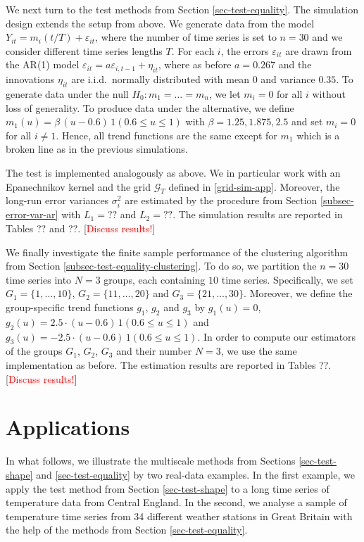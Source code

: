 We next turn to the test methods from Section \ref{sec-test-equality}. The simulation design extends the setup from above. We generate data from the model $Y_{it} = m_i(t/T) + \varepsilon_{it}$, where the number of time series is set to $n = 30$ and we consider different time series lengths $T$. For each $i$, the errors $\varepsilon_{it}$ are drawn from the AR(1) model $\varepsilon_{it} = a \varepsilon_{i,t-1} + \eta_{it}$, where as before $a = 0.267$ and the innovations $\eta_{it}$ are i.i.d.\ normally distributed with mean $0$ and variance $0.35$. To generate data under the null $H_0: m_1 = \ldots = m_n$, we let $m_i = 0$ for all $i$ without loss of generality. To produce data under the alternative, we define $m_1(u) = \beta \, (u - 0.6) \, 1(0.6 \le u \le 1)$ with $\beta = 1.25, 1.875, 2.5$ and set $m_i = 0$ for all $i \ne 1$. Hence, all trend functions are the same except for $m_1$ which is a broken line as in the previous simulations. 


The test is implemented analogously as above. We in particular work with an Epanechnikov kernel and the grid $\mathcal{G}_T$ defined in \eqref{grid-sim-app}. Moreover, the long-run error variances $\sigma_i^2$ are estimated by the procedure from Section \ref{subsec-error-var-ar} with $L_1 = ??$ and $L_2 = ??$. The simulation results are reported in Tables ?? and ??. [\textcolor{red}{Discuss results!}]


We finally investigate the finite sample performance of the clustering algorithm from Section \ref{subsec-test-equality-clustering}. To do so, we partition the $n = 30$ time series into $N=3$ groups, each containing $10$ time series. Specifically, we set $G_1 = \{1,\ldots,10\}$, $G_2 = \{11,\ldots,20\}$ and $G_3 =  \{21,\ldots,30\}$. Moreover, we define the group-specific trend functions $g_1$, $g_2$ and $g_3$ by $g_1(u) = 0$, $g_2(u) =  2.5 \cdot (u - 0.6) \, 1(0.6 \le u \le 1)$ and $g_3(u) =  -2.5 \cdot (u - 0.6) \, 1(0.6 \le u \le 1)$. In order to compute our estimators of the groups $G_1$, $G_2$, $G_3$ and their number $N = 3$, we use the same implementation as before. The estimation results are reported in Tables ??. [\textcolor{red}{Discuss results!}]   



\section{Applications}\label{sec-data}


In what follows, we illustrate the multiscale methods from Sections \ref{sec-test-shape} and \ref{sec-test-equality} by two real-data examples. In the first example, we apply the test method from Section \ref{sec-test-shape} to a long time series of temperature data from Central England. In the second, we analyse a sample of temperature time series from 34 different weather stations in Great Britain with the help of the methods from Section \ref{sec-test-equality}. 


